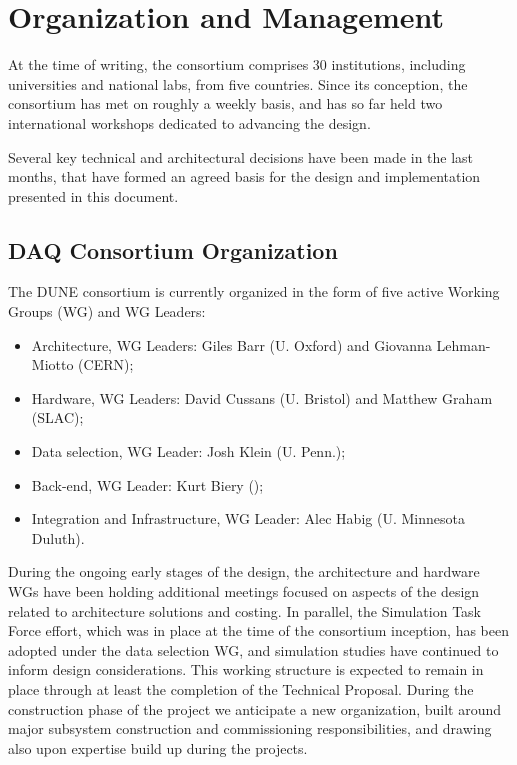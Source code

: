 
\section{Organization and Management}
\label{sec:fd-daq-org}

At the time of writing, the  consortium comprises \num{30} institutions, including universities and national labs, from five countries. Since its conception, the  consortium has met on roughly a weekly basis, and has so far held two international workshops dedicated to advancing the    design.

Several key technical and architectural decisions have been made in the last months, that have formed an agreed basis for the  design and implementation presented in this document.

\subsection{DAQ Consortium Organization}
\label{sec:fd-daq-org-consortium}

The DUNE  consortium is currently organized in the form of five active
Working Groups (WG) and WG Leaders:
\begin{itemize}
\item Architecture, WG Leaders: Giles Barr (U. Oxford) and Giovanna Lehman-Miotto (CERN);
\item Hardware, WG Leaders: David Cussans (U. Bristol) and Matthew Graham (SLAC);
\item Data selection, WG Leader: Josh Klein (U. Penn.);
\item Back-end, WG Leader: Kurt Biery (\fnal);
\item Integration and Infrastructure, WG Leader: Alec Habig
  (U. Minnesota Duluth).
\end{itemize}

During the ongoing early stages of the design, the architecture and hardware WGs have been holding additional meetings focused on aspects of the design related to architecture solutions and costing. In parallel, the  Simulation Task Force effort, which was in place at the time of the consortium inception, has been adopted under the data selection WG, and simulation studies have continued to inform design considerations. This working structure is expected to remain in place through at least the completion of the Technical Proposal. During the construction phase of the project we anticipate a new organization, built around major subsystem construction and commissioning responsibilities, and drawing also upon expertise build up during the  projects.

